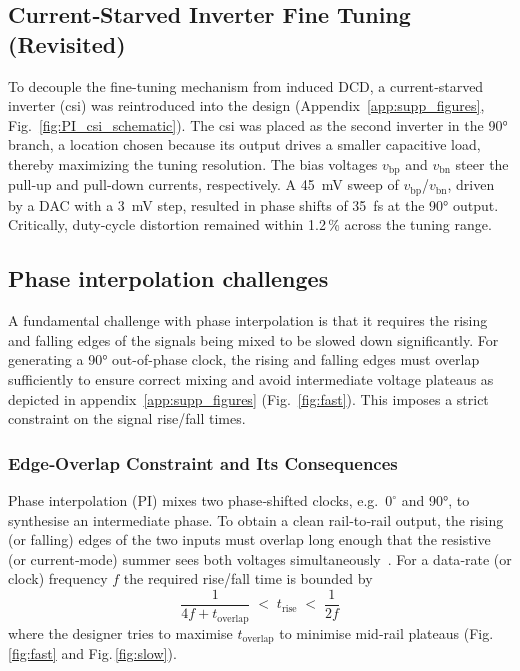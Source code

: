 \subsection{Current‑Starved Inverter Fine Tuning (Revisited)}\label{sec:csi}

To decouple the fine-tuning mechanism from induced DCD, a current‑starved inverter (\gls{csi}) was reintroduced into the design (Appendix~\ref{app:supp_figures}, Fig.~\ref{fig:PI_csi_schematic}). The \gls{csi} was placed as the second inverter in the \ang{90} branch, a location chosen because its output drives a smaller capacitive load, thereby maximizing the tuning resolution. The bias voltages $v_\text{bp}$ and $v_\text{bn}$ steer the pull‑up and pull‑down currents, respectively. A \SI{45}{\milli\volt} sweep of $v_\text{bp}$/$v_\text{bn}$, driven by a DAC with a \SI{3}{\milli\volt} step, resulted in phase shifts of \SI{35}{\femto\second} at the \ang{90} output. Critically, duty‑cycle distortion remained within 1.2\,\% across the tuning range.


\subsection{Phase interpolation challenges}\label{sec:PI_challenges}

A fundamental challenge with phase interpolation is that it requires the rising and falling edges of the signals being mixed to be slowed down significantly. For generating a \ang{90} out-of-phase clock, the rising and falling edges must overlap sufficiently to ensure correct mixing and avoid intermediate voltage plateaus as depicted in appendix~\ref{app:supp_figures} (Fig.~\ref{fig:fast}). This imposes a strict constraint on the signal rise/fall times. 

\subsubsection{Edge‑Overlap Constraint and Its Consequences}

Phase interpolation (PI) mixes two phase‑shifted clocks, e.g.\ $0^{\circ}$ and
\ang{90}, to synthesise an intermediate phase.  To obtain a clean
rail‑to‑rail output, the rising (or falling) edges of the two inputs must
overlap long enough that the resistive (or current‑mode) summer sees
both voltages simultaneously \cite{Razavi2023PI}.  For a data‑rate (or clock)
frequency $f$ the required rise/fall time is bounded by
%
\begin{equation}
{\;
     \frac{1}{4f+t_{\text{overlap}}} 
     \;<\; t_{\text{rise}} 
     \;<\; \frac{1}{2f}
     \;}
\label{eq:overlap}
\end{equation}
%
where the designer tries to maximise $t_{\text{overlap}}$ to minimise
mid‑rail plateaus (Fig.\,\ref{fig:fast} and Fig.\,\ref{fig:slow}).

